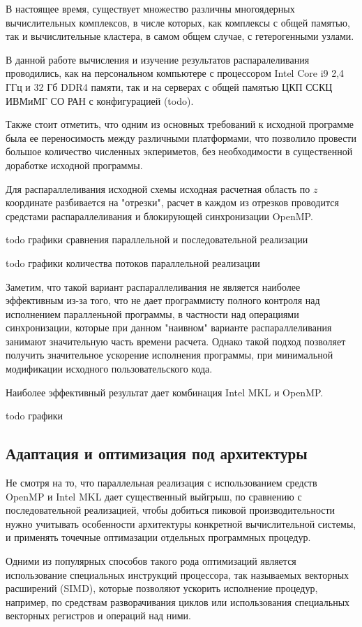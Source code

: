 В настоящее время, существует множество различны многоядерных вычислительных комплексов, в числе которых, как комплексы с общей памятью,
так и вычислительные кластера, в самом общем случае, с гетерогенными узлами.

В данной работе вычисления и изучение результатов распаралеливания проводились, как на персональном компьютере с процессором Intel Core i9 2,4 ГГц и
32 Гб DDR4 памяти, так и на серверах с общей памятью ЦКП ССКЦ ИВМиМГ СО РАН с конфигурацией (todo).

Также стоит отметить, что одним из основных требований к исходной программе была ее переносимость между различными платформами,
что позволило провести большое количество численных экпериметов, без необходимости в существенной доработке исходной программы.

Для распараллеливания исходной схемы исходная расчетная область по $z$ координате разбивается на "отрезки",
расчет в каждом из отрезков проводится средстами распараллеливания и блокирующей синхронизации OpenMP.

todo графики сравнения параллельной и последовательной реализации

todo графики количества потоков параллельной реализации

Заметим, что такой вариант распараллеливания не является наиболее эффективным из-за того, что не дает программисту полного контроля
над исполнением паралленьной программы, в частности над операциями синхронизации, которые при данном "наивном" варианте распараллеливания
занимают значительную часть времени расчета. Однако такой подход позволяет получить значительное ускорение исполнения программы,
при минимальной модификации исходного пользовательского кода.

Наиболее эффективный результат дает комбинация Intel MKL и OpenMP.

todo графики

\subsection{Адаптация и оптимизация под архитектуры}
Не смотря на то, что параллельная реализация с использованием средств OpenMP и Intel MKL дает существенный выйгрыш,
по сравнению с последовательной реализацией, чтобы добиться пиковой производительности нужно учитывать особенности
архитектуры конкретной вычислительной системы, и применять точечные оптимазации отдельных программных процедур.

Одними из популярных способов такого рода оптимизаций является использование специальных инструкций процессора,
так называемых векторных расширений (SIMD), которые позволяют ускорить исполнение процедур, например, по средствам
разворачивания циклов или использования специальных векторных регистров и операций над ними.

